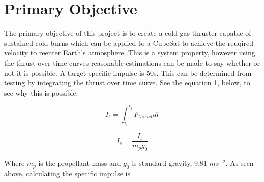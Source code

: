 \documentclass[conference]{IEEEtran} %
\begin{document}
\section{Primary Objective}
\label{sec:primary-obj}
The primary objective of this project is to create a cold gas thruster capable of sustained cold burns which can be applied to a CubeSat to achieve the reuqired
velocity to reenter Earth's atmosphere. This is a system property, however using the thrust over time curves reasonable estimations can be made to say whether or not it is possible.
A target specific impulse is 50s. This can be determined from testing by integrating the thrust over time curve. See the equation 1, below, to see why this is possible.

\begin{equation} \label{specific impulse}
  I_t    = \int_{t_i}^{t_f} F_{thrust} dt
\end{equation}

\begin{equation} \label{specific impulse}
  I_s = \frac{I_t}{m_p g_0}
\end{equation}

Where $m_p$ is the propellant mass and $g_0$ is standard gravity, 9.81 $ms^{-2}$.
As seen above, calculating the specific impulse is
\end{document}
